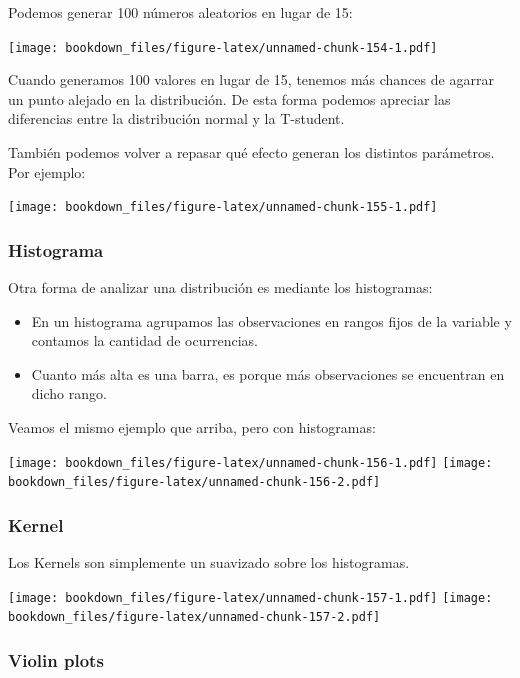 \documentclass[]{book}
\providecommand{\tightlist}{%
  \setlength{\itemsep}{0pt}\setlength{\parskip}{0pt}}
\begin{document}
Podemos generar 100 números aleatorios en lugar de 15:

\texttt{[image: bookdown\_files/figure-latex/unnamed-chunk-154-1.pdf]}

Cuando generamos 100 valores en lugar de 15, tenemos más chances de agarrar un punto alejado en la distribución. De esta forma podemos apreciar las diferencias entre la distribución normal y la T-student.

También podemos volver a repasar qué efecto generan los distintos parámetros. Por ejemplo:

\texttt{[image: bookdown\_files/figure-latex/unnamed-chunk-155-1.pdf]}

\hypertarget{histograma}{%
\subsubsection{Histograma}\label{histograma}}

Otra forma de analizar una distribución es mediante los histogramas:

\begin{itemize}
\tightlist
\item
  En un histograma agrupamos las observaciones en rangos fijos de la variable y contamos la cantidad de ocurrencias.
\item
  Cuanto más alta es una barra, es porque más observaciones se encuentran en dicho rango.
\end{itemize}

Veamos el mismo ejemplo que arriba, pero con histogramas:

\texttt{[image: bookdown\_files/figure-latex/unnamed-chunk-156-1.pdf]} \texttt{[image: bookdown\_files/figure-latex/unnamed-chunk-156-2.pdf]}

\hypertarget{kernel}{%
\subsubsection{Kernel}\label{kernel}}

Los Kernels son simplemente un suavizado sobre los histogramas.

\texttt{[image: bookdown\_files/figure-latex/unnamed-chunk-157-1.pdf]} \texttt{[image: bookdown\_files/figure-latex/unnamed-chunk-157-2.pdf]}

\hypertarget{violin-plots}{%
\subsubsection{Violin plots}\label{violin-plots}}
\end{document}
